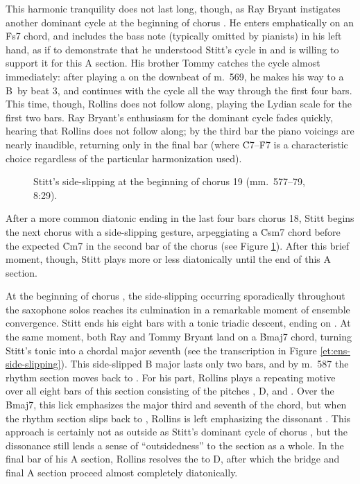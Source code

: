 This harmonic tranquility does not last long, though, as Ray Bryant instigates
another dominant cycle at the beginning of chorus . He enters
emphatically on an \h{Fs7} chord, and includes the bass note (typically
omitted by pianists) in his left hand, as if to demonstrate that he understood
Stitt's cycle in  and is willing to support it for this A section.
His brother Tommy catches the cycle almost immediately: after playing a \Bflat
on the downbeat of m.~569, he makes his way to a B\nat\ by beat 3, and
continues with the cycle all the way through the first four bars. This time,
though, Rollins does not follow along, playing the \Bflat Lydian scale
for the first two bars. Ray Bryant's enthusiasm for the dominant cycle fades
quickly, hearing that Rollins does not follow along; by the third bar the
piano voicings are nearly inaudible, returning only in the final bar (where
\h{C7}--\h{F7} is a characteristic choice regardless of the particular
harmonization used).

\begin{figure}[tbp]
  \caption[Stitt's side-slipping at the beginning of chorus 19.]{%
    Stitt's side-slipping at the beginning of chorus 19 (mm.~577--79, 8:29).}
  \label{et:ss-side-slipping}
\end{figure}

After a more common diatonic ending in the last four bars chorus 18, Stitt
begins the next chorus with a side-slipping gesture, arpeggiating a \h{Csm7}
chord before the expected \h{Cm7} in the second bar of the chorus (see Figure
\ref{et:ss-side-slipping}). After this brief moment, though, Stitt plays more
or less diatonically until the end of this A section.

At the beginning of chorus , the side-slipping occurring
sporadically throughout the saxophone solos reaches its culmination in a
remarkable moment of ensemble convergence. Stitt ends his eight bars with a
tonic triadic descent, ending on \Bflat. At the same moment, both Ray and
Tommy Bryant land on a \h{Bmaj7} chord, turning Stitt's tonic \Bflat into a
chordal major seventh (see the transcription in Figure
\ref{et:ens-side-slipping}). This side-slipped B major lasts only
two bars, and by m.~587 the rhythm section moves back to \Bflat. For his part,
Rollins plays a repeating motive over all eight bars of this section
consisting of the pitches \Eflat, D, and \Bflat. Over the \h{Bmaj7}, this lick
emphasizes the major third and seventh of the chord, but when the rhythm
section slips back to \Bflat, Rollins is left emphasizing the dissonant .
This approach is certainly not as outside as Stitt's dominant cycle of chorus
, but the dissonance still lends a sense of ``outsidedness'' to the
section as a whole. In the final bar of his A section, Rollins resolves the
\Eflat to D, after which the bridge and final A section proceed almost
completely diatonically.

